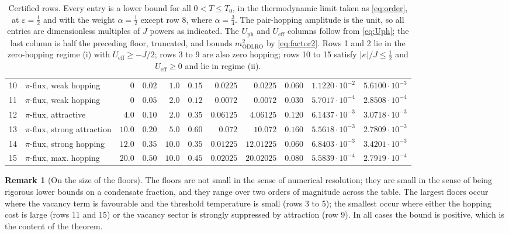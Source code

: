 \documentclass[11pt]{article}
\numberwithin{equation}{section}
\newcommand{\eff}{\mathrm{eff}}
\newcommand{\ODLRO}{\mathrm{ODLRO}}
\theoremstyle{definition}
\newtheorem{remark}[theorem]{Remark}
\begin{document}
\begin{table}[htbp]
\begin{tabular}{@{}rlrrrrrrrrr@{}}
10 & $\pi$-flux, weak hopping & $0$ & $0.02$ & $1.0$ & $0.15$ & $0.0225$ & $0.0225$ & $0.060$ & $1.1220\cdot10^{-2}$ & $5.6100\cdot10^{-3}$\\
11 & $\pi$-flux, weak hopping & $0$ & $0.05$ & $2.0$ & $0.12$ & $0.0072$ & $0.0072$ & $0.030$ & $5.7017\cdot10^{-4}$ & $2.8508\cdot10^{-4}$\\
12 & $\pi$-flux, attractive & $4.0$ & $0.10$ & $2.0$ & $0.35$ & $0.06125$ & $4.06125$ & $0.120$ & $6.1437\cdot10^{-3}$ & $3.0718\cdot10^{-3}$\\
13 & $\pi$-flux, strong attraction & $10.0$ & $0.20$ & $5.0$ & $0.60$ & $0.072$ & $10.072$ & $0.160$ & $5.5618\cdot10^{-3}$ & $2.7809\cdot10^{-3}$\\
14 & $\pi$-flux, strong hopping & $12.0$ & $0.35$ & $10.0$ & $0.35$ & $0.01225$ & $12.01225$ & $0.060$ & $6.8403\cdot10^{-3}$ & $3.4201\cdot10^{-3}$\\
15 & $\pi$-flux, max. hopping & $20.0$ & $0.50$ & $10.0$ & $0.45$ & $0.02025$ & $20.02025$ & $0.080$ & $5.5839\cdot10^{-4}$ & $2.7919\cdot10^{-4}$\\
\bottomrule
\end{tabular}
\caption{Certified rows. Every entry is a lower bound for all $0<T\le T_0$, in the
thermodynamic limit taken as \eqref{eq:order}, at $\varepsilon=\frac12$ and with the weight
$\alpha=\frac12$ except row 8, where $\alpha=\frac34$. The pair-hopping amplitude is the
unit, so all entries are dimensionless multiples of $J$ powers as indicated. The
$U_{\mathrm{ph}}$ and $U_{\eff}$ columns follow from \eqref{eq:Uph}; the last column is half the
preceding floor, truncated, and bounds $m^{2}_{\ODLRO}$ by \eqref{eq:factor2}. Rows 1 and 2 lie in the
zero-hopping regime (i) with $U_{\eff}\ge-J/2$; rows 3 to 9 are also zero hopping; rows 10
to 15 satisfy $|\kappa|/J\le\frac12$ and $U_{\eff}\ge0$ and lie in regime (ii).}
\label{tab:rows}
\end{table}

\begin{remark}[On the size of the floors]\label{rem:floors}
The floors are not small in the sense of numerical resolution; they are small in the sense
of being rigorous lower bounds on a condensate fraction, and they range over two orders of
magnitude across the table. The largest floors occur where the vacancy term is favourable
and the threshold temperature is small (rows 3 to 5); the smallest occur where either the
hopping cost is large (rows 11 and 15) or the vacancy sector is strongly suppressed by
attraction (row 9). In all cases the bound is positive, which is the content of the
theorem.
\end{remark}
\end{document}
